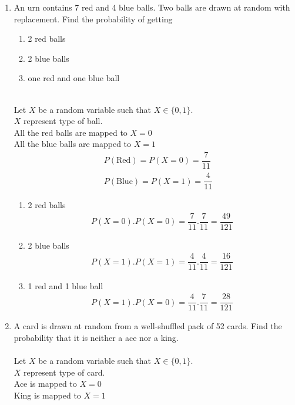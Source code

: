 \documentclass[journal,12pt,twocolumn]{IEEEtran}
\renewcommand\thesection{\arabic{section}}
\begin{document}
\begin{enumerate}[label=\thesection.\arabic*.,ref=\thesection.\theenumi]
\item An urn contains 7 red and 4 blue balls. Two balls are drawn at random with replacement. Find the probability of getting
\begin{enumerate}
\item 2 red balls
\item 2 blue balls
\item one red and one blue ball
\end{enumerate}
\solution\\
Let $X$ be a random variable such that $X \in\{0,1\}$.\\ $X$ represent type of ball.\\
All the red balls are mapped to $X=0$\\
 All the blue balls are mapped to $X=1$\\
 \begin{align}
&P(\text{Red}) =  P(X=0) = \dfrac{7}{11}\\
&P(\text{Blue}) =  P(X=1) = \dfrac{4}{11}
 \end{align}
 \begin{enumerate}
 \item 2 red balls
 \begin{align}
 P(X=0).P(X=0) = \dfrac{7}{11}.\dfrac{7}{11} =\dfrac{49}{121}
 \end{align}
 \item 2 blue balls
 \begin{align}
 P(X=1).P(X=1) = \dfrac{4}{11}.\dfrac{4}{11} =\dfrac{16}{121}
 \end{align}
 \item 1 red and 1 blue ball
 \begin{align}
 P(X=1).P(X=0) = \dfrac{4}{11}.\dfrac{7}{11} =\dfrac{28}{121}
 \end{align}
 \end{enumerate}
 \item A card is drawn at random from a well-shuffled pack of 52 cards. Find the probability that it is neither a ace nor a king.\\
 \solution\\
 Let $X$ be a random variable such that $X \in\{0,1\}$.\\ $X$ represent type of card.\\
Ace is mapped to $X=0$\\
 King is mapped to $X=1$\\

\end{enumerate}
\end{document}

